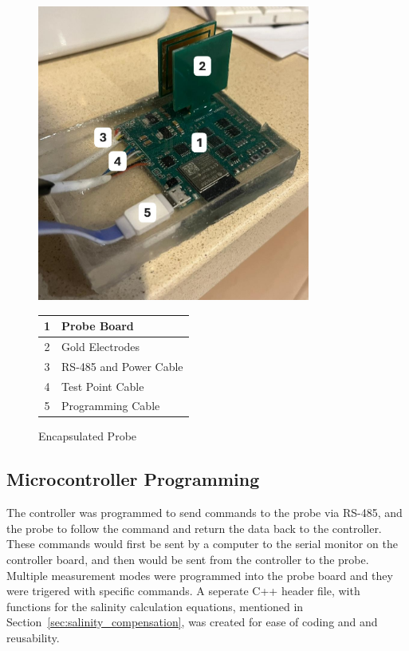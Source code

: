 \begin{figure}[H]
    \begin{minipage}{0.5\textwidth}
        \centering
        \includegraphics[width=0.8\textwidth]{Figures/encapsulated_probe.jpg}
    \end{minipage}
    \begin{minipage}{0.5\textwidth}
        \centering
        \begin{tabular}{cl} \hline
            1 & Probe Board \\ \hline
            2 & Gold Electrodes \\ \hline
            3 & RS-485 and Power Cable \\ \hline
            4 & Test Point Cable \\ \hline
            5 & Programming Cable \\ \hline
        \end{tabular}
    \end{minipage}
    \caption{Encapsulated Probe}
    \label{fig:encapsulated_probe} %
\end{figure}

\subsection{Microcontroller Programming}\label{sec:uc_program}
The controller was programmed to send commands to the probe via RS-485, and the probe to follow the command and return the data back to the controller.
These commands would first be sent by a computer to the serial monitor on the controller board, and then would be sent from the controller to the probe.
Multiple measurement modes were programmed into the probe board and they were trigered with specific commands.
A seperate C++ header file, with functions for the salinity calculation equations, mentioned in Section~\ref{sec:salinity_compensation}, was created for ease of coding and and reusability.

